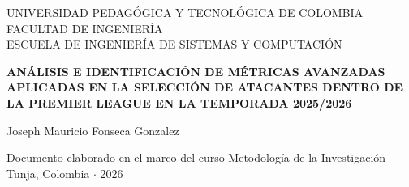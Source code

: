 \begin{titlepage}
    \centering
    \begin{singlespace}
        UNIVERSIDAD PEDAGÓGICA Y TECNOLÓGICA DE COLOMBIA\\
        FACULTAD DE INGENIERÍA\\
        ESCUELA DE INGENIERÍA DE SISTEMAS Y COMPUTACIÓN

        \vfill %

        {\bfseries ANÁLISIS E IDENTIFICACIÓN DE MÉTRICAS AVANZADAS APLICADAS EN LA SELECCIÓN DE ATACANTES DENTRO DE LA PREMIER LEAGUE EN LA TEMPORADA 2025/2026\par}

        \vfill


        Joseph Mauricio Fonseca Gonzalez\\


        \vfill

        Documento elaborado en el marco del curso Metodología de la Investigación\\[0.5em]
        Tunja, Colombia $\cdot$ 2026
    \end{singlespace}
\end{titlepage}